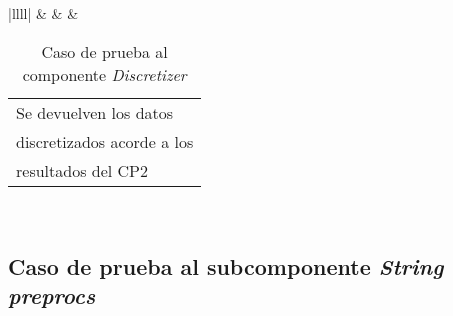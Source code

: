 \begin{table}[H]
\begin{spacing}{1.3}
{\begin{tabular}{|llll|}
			                                                                 &  &  & \begin{tabular}[c]{@{}l@{}}Se devuelven los datos\\ discretizados acorde a los \\ resultados del CP2\end{tabular} \\ \hline
		\end{tabular}%
	}
	\end{spacing}
	\caption{Caso de prueba al componente \textit{Discretizer}}
	\label{tab:cp-disc}
\end{table}



\subsection{Caso de prueba al subcomponente \textit{String preprocs}}

